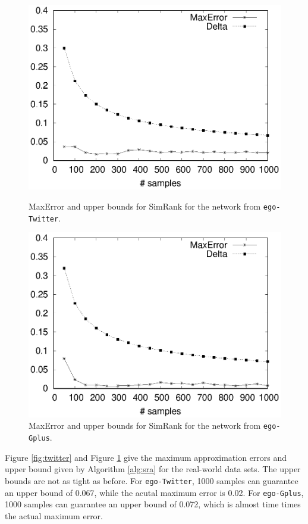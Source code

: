 \documentclass{article}
\begin{document}
\begin{figure}[!t]
\centering
\begin{minipage}{.45\textwidth}
\centering
\includegraphics[width=.9\textwidth]{simrank_twitter_apprx_error.eps}
\caption{\textsf{MaxError} and upper bounds for SimRank for the network from \texttt{ego-Twitter}.}
\label{fig:twitter}
\end{minipage}
\hspace{1cm}
\begin{minipage}{.45\textwidth}
\centering
\includegraphics[width=.9\textwidth]{simrank_gplus_apprx_error.eps}
\caption{\textsf{MaxError} and upper bounds for SimRank for the network from \texttt{ego-Gplus}.}
\label{fig:gplus}
\end{minipage}
\end{figure}

Figure \ref{fig:twitter} and Figure \ref{fig:gplus} give the maximum approximation errors and upper bound given by Algorithm \ref{alg:sra} for the real-world data sets. The upper bounds are not as tight as before. For \texttt{ego-Twitter}, 1000 samples can guarantee an upper bound of 0.067, while the acutal maximum error is 0.02. For \texttt{ego-Gplus}, 1000 samples can guarantee an upper bound of 0.072, which is almost time times the actual maximum error.
\end{document}
